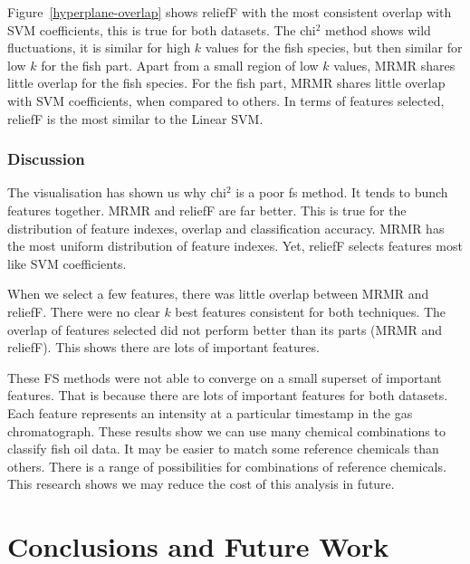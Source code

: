 \documentclass[runningheads]{llncs}
\begin{document}
Figure~\ref{hyperplane-overlap} shows reliefF with the most consistent overlap with SVM coefficients, this is true for both datasets.
The chi$^2$ method shows wild fluctuations, it is similar for high $k$ values for the fish species, but then similar for low $k$ for the fish part.
Apart from a small region of low $k$ values, MRMR shares little overlap for the fish species.
For the fish part, MRMR shares little overlap with SVM coefficients, when compared to others.
In terms of features selected, reliefF is the most similar to the Linear SVM.

\subsubsection{Discussion}
\label{sec:visualisation-discussion}

The visualisation has shown us why chi$^2$ is a poor fs method.
It tends to bunch features together.
MRMR and reliefF are far better.
This is true for the distribution of feature indexes, overlap and classification accuracy.
MRMR has the most uniform distribution of feature indexes.
Yet, reliefF selects features most like SVM coefficients.

When we select a few features, there was little overlap between MRMR and reliefF.
There were no clear $k$ best features consistent for both techniques.
The overlap of features selected did not perform better than its parts (MRMR and reliefF).
This shows there are lots of important features.

These FS methods were not able to converge on a small superset of important features.
That is because there are lots of important features for both datasets.
Each feature represents an intensity at a particular timestamp in the gas chromatograph.
These results show we can use many chemical combinations to classify fish oil data.
It may be easier to match some reference chemicals than others.
There is a range of possibilities for combinations of reference chemicals.
This research shows we may reduce the cost of this analysis in future.

\section{Conclusions and Future Work}

\end{document}
